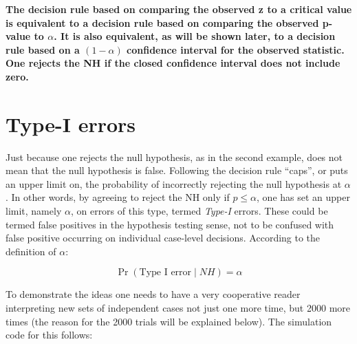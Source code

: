 \documentclass[
]{book}
\begin{document}
\textbf{The decision rule based on comparing the observed z to a critical value is equivalent to a decision rule based on comparing the observed p-value to \(\alpha\). It is also equivalent, as will be shown later, to a decision rule based on a \(\left ( 1-\alpha \right )\) confidence interval for the observed statistic. One rejects the NH if the closed confidence interval does not include zero.}

\hypertarget{type-i-errors}{%
\section{Type-I errors}\label{type-i-errors}}

Just because one rejects the null hypothesis, as in the second example, does not mean that the null hypothesis is false. Following the decision rule ``caps'', or puts an upper limit on, the probability of incorrectly rejecting the null hypothesis at \(\alpha\). In other words, by agreeing to reject the NH only if \(p \leq \alpha\), one has set an upper limit, namely \(\alpha\), on errors of this type, termed \emph{Type-I} errors. These could be termed false positives in the hypothesis testing sense, not to be confused with false positive occurring on individual case-level decisions. According to the definition of \(\alpha\):

\begin{equation*} 
\Pr( \text{Type I error} \mid {NH} )=\alpha
\end{equation*}

To demonstrate the ideas one needs to have a very cooperative reader interpreting new sets of independent cases not just one more time, but 2000 more times (the reason for the 2000 trials will be explained below). The simulation code for this follows:
\end{document}
